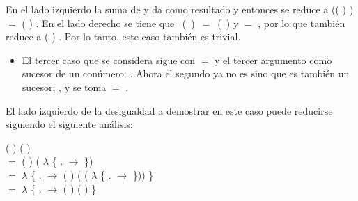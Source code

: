 \begin{AgdaAlign}
En el lado izquierdo la suma de  y  da como resultado  y entonces se reduce a   (( ) \AgdaFunction{+} ) $=$ ( ) \AgdaFunction{+} . En el lado derecho se tiene que \hbox{  ( ) $=$ ( )} y    $=$ , por lo que también reduce a ( ) \AgdaFunction{+} . Por lo tanto, este caso también es trivial.

\begin{itemize}
\item El tercer caso que se considera sigue con  $=$  y el tercer argumento como sucesor de un conúmero:  . Ahora el segundo ya no es  sino que es también un sucesor,  , y se toma  $=$  . 
\end{itemize}

El lado izquierdo de la desigualdad a demostrar en este caso puede reducirse siguiendo el siguiente análisis: 

 ( \AgdaFunction{+}  ) (  \AgdaFunction{+} ) \\ 
$=$  ( ) ( $\lambda$ \{ . $\rightarrow$   \AgdaFunction{+}  \}) \\
$=$  $\lambda$ \{ . $\rightarrow$  ( ) ( ( $\lambda$ \{ . $\rightarrow$   \AgdaFunction{+}  \})) \}\\ 
$=$  $\lambda$ \{ . $\rightarrow$  ( ) (  \AgdaFunction{+} ) \}


\end{AgdaAlign}

